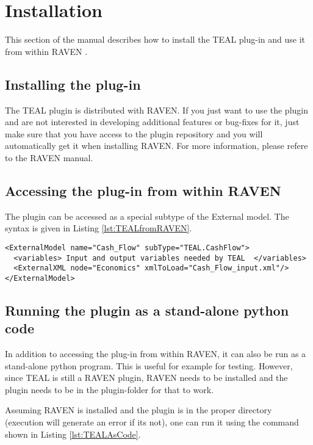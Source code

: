 \section{Installation}
\label{sec:Installation}

This section of the manual describes how to install the TEAL plug-in and use it from within RAVEN \cite{RAVEN}.

\subsection{Installing the plug-in}
The TEAL plugin is distributed with RAVEN. If you just want to use the plugin and are not interested in developing additional features or bug-fixes for it, just make sure that you have access to the plugin repository and you will automatically get it when installing RAVEN.
For more information, please refere to the RAVEN manual.

\subsection{Accessing the plug-in from within RAVEN}
The plugin can be accessed as a special subtype of the External model. The syntax is given in Listing \ref{lst:TEALfromRAVEN}.

\begin{lstlisting}[style=XML,morekeywords={anAttribute},caption=Call TEAL.CashFlow from RAVEN input., label=lst:TEALfromRAVEN]
<ExternalModel name="Cash_Flow" subType="TEAL.CashFlow">
  <variables> Input and output variables needed by TEAL  </variables>
  <ExternalXML node="Economics" xmlToLoad="Cash_Flow_input.xml"/>
</ExternalModel>
\end{lstlisting}

\subsection{Running the plugin as a stand-alone python code}

In addition to accessing the plug-in from within RAVEN, it can also be run as a stand-alone python program. This is useful for example for testing. However, since TEAL is still a RAVEN plugin, RAVEN needs to be installed and the plugin needs to be in the plugin-folder for that to work.

Assuming RAVEN is installed and the plugin is in the proper directory (execution will generate an error if its not), one can run it using the command shown in Listing \ref{lst:TEALAsCode}.

